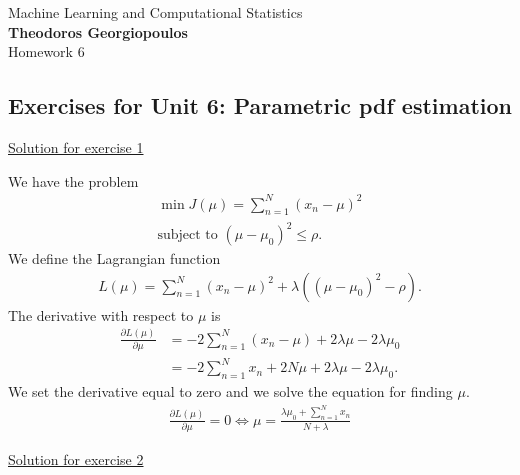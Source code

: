 \documentclass[12pt]{book}
\begin{document}
\begin{center}
{\Large Machine Learning and Computational Statistics}\\
\large\textbf{Theodoros Georgiopoulos}\\ %
\Large Homework 6 %
\end{center}

\vspace{0.2 cm}
\begin{center}
	\subsection*{Exercises for Unit 6: Parametric pdf estimation}
\end{center}
\vspace{0.2 cm}

{\underline{\large Solution for exercise 1}}
\vspace{0.1 cm}

\noindent

We have the problem
\begin{align*}
\min J(\mu) = \sum_{n=1}^{N}(x_n-\mu)^2 \\
\text{subject to } (\mu - \mu_0)^2 \leq \rho.
\end{align*}
We define the Lagrangian function
\begin{align*}
L(\mu) = \sum_{n=1}^{N}(x_n-\mu)^2 + \lambda((\mu - \mu_0)^2 - \rho).
\end{align*}
The derivative with respect to $\mu$ is
\begin{align*}
\frac{\partial{L(\mu)}}{\partial{\mu}} &= -2\sum_{n=1}^{N}(x_n-\mu) + 2\lambda\mu - 2\lambda \mu_0 \\
&= -2\sum_{n=1}^{N}x_n + 2N\mu + 2\lambda\mu - 2\lambda \mu_0.
\end{align*}
We set the derivative equal to zero and we solve the equation for finding $\mu$.
\begin{align*}
\frac{\partial{L(\mu)}}{\partial{\mu}} = 0 \iff \mu = \frac{\lambda\mu_0 + \sum_{n=1}^{N}x_n}{N + \lambda}
\end{align*}

\vspace{0.3 cm}
{\underline{\large Solution for exercise 2}}
\vspace{0.3 cm}
\end{document}
